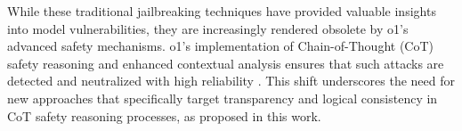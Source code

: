 While these traditional jailbreaking techniques have provided valuable insights into model vulnerabilities, they are increasingly rendered obsolete by o1's advanced safety mechanisms. o1’s implementation of Chain-of-Thought (CoT) safety reasoning and enhanced contextual analysis ensures that such attacks are detected and neutralized with high reliability \citep{openai2024openaio1card,openai2024o3mini,guan2024deliberative}. This shift underscores the need for new approaches that specifically target transparency and logical consistency in CoT safety reasoning processes, as proposed in this work.